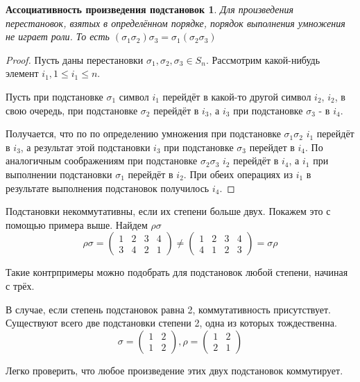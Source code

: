 \documentclass[a4paper, 12pt]{article}
\newtheorem*{associativity_change}{Ассоциативность произведения подстановок}
\begin{document}
\begin{associativity_change}
Для произведения перестановок, взятых в определённом порядке, порядок выполнения умножения не играет роли. То есть $(\sigma_1 \sigma_2) \sigma_3 = \sigma_1 (\sigma_2 \sigma_3)$
\end{associativity_change}
\begin{proof}
Пусть даны перестановки $\sigma_1, \sigma_2, \sigma_3 \in S_n$. Рассмотрим какой-нибудь элемент $i_1, 1 \leqslant i_1 \leqslant n$. 

Пусть при подстановке $\sigma_1$ символ $i_1$ перейдёт в какой-то другой символ $i_2$, $i_2$, в свою очередь, при подстановке $\sigma_2$ перейдёт в $i_3$, а $i_3$ при подстановке $\sigma_3$ - в $i_4$. 

Получается, что по по определению умножения при подстановке $\sigma_1 \sigma_2$ $i_1$ перейдёт в $i_3$, а результат этой подстановки $i_3$ при подстановке $\sigma_3$ перейдет в $i_4$. По аналогичным соображениям при подстановке $\sigma_2 \sigma_3$ $i_2$ перейдёт в $i_4$, а $i_1$ при выполнении подстановки $\sigma_1$ перейдёт в $i_2$. При обеих операциях из $i_1$ в результате выполнения подстановок получилось $i_4$.
\end{proof}

Подстановки $\textit{некоммутативны}$, если их степени больше двух. Покажем это с помощью примера выше. Найдем $\rho\sigma$
\[\rho\sigma = \begin{pmatrix}1 & 2 & 3 & 4 \\ 3 & 4 & 2 & 1\end{pmatrix} \neq \begin{pmatrix}1 & 2 & 3 & 4 \\ 4 & 1 & 2 & 3\end{pmatrix} = \sigma\rho\]

Такие контрпримеры можно подобрать для подстановок любой степени, начиная с трёх.

В случае, если степень подстановок равна 2, коммутативность присутствует. Существуют всего две подстановки степени 2, одна из которых тождественна.
\[\sigma = \begin{pmatrix}1 & 2 \\ 1 & 2\end{pmatrix}, \rho = \begin{pmatrix}1 & 2 \\ 2 & 1\end{pmatrix}\]

Легко проверить, что любое произведение этих двух подстановок коммутирует. 
\end{document}
